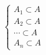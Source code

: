 \documentclass[preview]{standalone}
\begin{document}
\begin{align*}
\begin{cases}
                         A_1 \subset A \\
                         A_2 \subset A \\
                         \cdots \subset A \\
                         A_n \subset A
                         \end{cases}
\end{align*}
\end{document}
